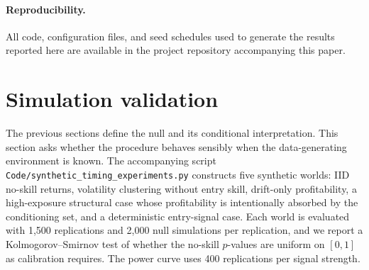 \documentclass[preprint,12pt]{elsarticle}
\theoremstyle{definition}
\begin{document}
\paragraph{Reproducibility.} All code, configuration files, and seed schedules used to generate the results reported here are available in the project repository accompanying this paper.

\section{Simulation validation}
\label{sec:simulation-validation}

The previous sections define the null and its conditional interpretation. This section asks whether the procedure behaves sensibly when the data-generating environment is known. The accompanying script \texttt{Code/synthetic\_timing\_experiments.py} constructs five synthetic worlds: IID no-skill returns, volatility clustering without entry skill, drift-only profitability, a high-exposure structural case whose profitability is intentionally absorbed by the conditioning set, and a deterministic entry-signal case. Each world is evaluated with 1{,}500 replications and 2{,}000 null simulations per replication, and we report a Kolmogorov--Smirnov test of whether the no-skill $p$-values are uniform on $[0,1]$ as calibration requires. The power curve uses 400 replications per signal strength.
\end{document}
